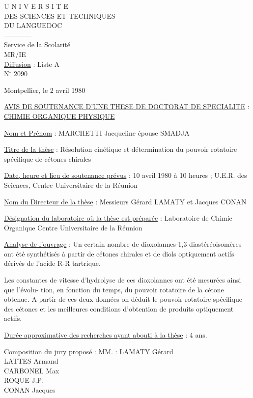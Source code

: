 \begin{center}
U N I V E R S I T E\\
DES SCIENCES ET TECHNIQUES\\
DU LANGUEDOC\\
------------\\
Service de la Scolarité\\
MR/IE\\
\uline{Diffusion} : Liste A\\
N$^\circ$ 2090
\end{center}
Montpellier, le 2 avril 1980

\begin{center}
\uline{AVIS DE SOUTENANCE D'UNE THESE DE DOCTORAT DE SPECIALITE} :\\
\uline{CHIMIE ORGANIQUE PHYSIQUE}
\end{center}
\uline{Nom et Prénom} : MARCHETTI Jacqueline épouse SMADJA

\uline{Titre de la thèse} : Résolution cinétique et détermination du pouvoir rotatoire spécifique
de cétones chirales

\uline{Date, heure et lieu de soutenance prévus} : 10 avril 1980 à 10 heures ; U.E.R. des Sciences,
Centre Universitaire de la Réunion

\uline{Nom du Directeur de la thèse} : Messieurs Gérard LAMATY et Jacques CONAN

\uline{Désignation du laboratoire où la thèse est préparée} :
Laboratoire de Chimie Organique Centre Universitaire de la Réunion

\uline{Analyse de l'ouvrage} :
Un certain nombre de dioxolannes-1,3 diastéréoisomères ont été synthétisés à partir de cétones
chirales et de diols optiquement actifs dérivés de l'acide R-R tartrique.

Les constantes de vitesse d'hydrolyse de ces dioxolannes ont été mesurées ainsi que l'évolu-
tion, en fonction du temps, du pouvoir rotatoire de la cétone obtenue. A partir de ces deux
données on déduit le pouvoir rotatoire spécifique des cétones et les meilleures conditions
d'obtention de produits optiquement actifs.

\uline{Durée approximative des recherches ayant abouti à la thèse} : 4 ans.

\uline{Composition du jury proposé} : MM. : LAMATY Gérard\\
LATTES Armand\\
CARBONEL Max\\
ROQUE J.P.\\
CONAN Jacques

